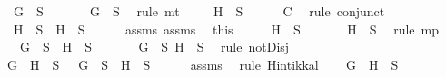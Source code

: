 \begin{isabellebody}
\ {\isachardoublequoteopen}\isactrlbold {\isasymnot}\ G\ {\isasymnotin}\ S{\isachardoublequoteclose}\isanewline
\ \ \ \ \isamarkupfalse%
\ {\isacartoucheopen}{\isasymnot}\ {\isacharparenleft}G\ {\isasymnotin}\ S{\isacharparenright}{\isacartoucheclose}\ \isamarkupfalse%
\ {\isacharparenleft}rule\ mt{\isacharparenright}\isanewline
\ \ \isamarkupfalse%
\ {\isachardoublequoteopen}\isactrlbold {\isasymnot}\ H\ {\isasymin}\ S{\isachardoublequoteclose}\isanewline
\ \ \ \ \isamarkupfalse%
\ C\ \isamarkupfalse%
\ {\isacharparenleft}rule\ conjunct{}{\isacharparenright}\isanewline
\ \ \isamarkupfalse%
\ {\isachardoublequoteopen}\isactrlbold {\isasymnot}\ H\ {\isasymin}\ S\ {\isasymlongrightarrow}\ H\ {\isasymnotin}\ S{\isachardoublequoteclose}\isanewline
\ \ \ \ \isamarkupfalse%
\ assms{\isacharparenleft}{}{\isacharparenright}\ assms{\isacharparenleft}{}{\isacharparenright}\ \isamarkupfalse%
\ this\isanewline
\ \ \isamarkupfalse%
\ \isamarkupfalse%
\ {\isachardoublequoteopen}H\ {\isasymnotin}\ S{\isachardoublequoteclose}\isanewline
\ \ \ \ \isamarkupfalse%
\ {\isacartoucheopen}\isactrlbold {\isasymnot}\ H\ {\isasymin}\ S{\isacartoucheclose}\ \isamarkupfalse%
\ {\isacharparenleft}rule\ mp{\isacharparenright}\isanewline
\ \ \isamarkupfalse%
\ {\isachardoublequoteopen}{\isasymnot}\ {\isacharparenleft}\isactrlbold {\isasymnot}\ G\ {\isasymin}\ S\ {\isasymor}\ H\ {\isasymin}\ S{\isacharparenright}{\isachardoublequoteclose}\isanewline
\ \ \ \ \isamarkupfalse%
\ {\isacartoucheopen}\isactrlbold {\isasymnot}\ G\ {\isasymnotin}\ S{\isacartoucheclose}\ {\isacartoucheopen}H\ {\isasymnotin}\ S{\isacartoucheclose}\ \isamarkupfalse%
\ {\isacharparenleft}rule\ notDisj{\isacharparenright}\isanewline
\ \ \isamarkupfalse%
\ {\isachardoublequoteopen}G\ \isactrlbold {\isasymrightarrow}\ H\ {\isasymin}\ S\ {\isasymlongrightarrow}\ \isactrlbold {\isasymnot}\ G\ {\isasymin}\ S\ {\isasymor}\ H\ {\isasymin}\ S{\isachardoublequoteclose}\isanewline
\ \ \ \ \isamarkupfalse%
\ assms{\isacharparenleft}{}{\isacharparenright}\ \isamarkupfalse%
\ {\isacharparenleft}rule\ Hintikka{\isacharunderscore}l{}{\isacharparenright}\isanewline
\ \ \isamarkupfalse%
\ {\isachardoublequoteopen}G\ \isactrlbold {\isasymrightarrow}\ H\ {\isasymnotin}\ S{\isachardoublequoteclose}\isanewline

\end{isabellebody}

